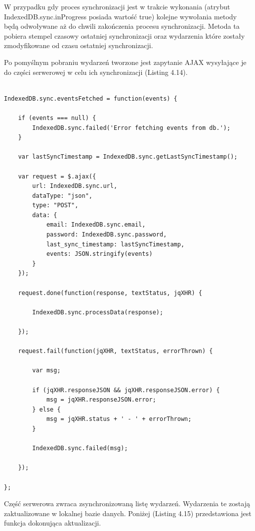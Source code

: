 W przypadku gdy proces synchronizacji jest w trakcie wykonania (atrybut  IndexedDB.sync.inProgress posiada wartość true) kolejne wywołania metody będą odwoływane aż do chwili zakończenia procesu synchronizacji. Metoda ta pobiera stempel czasowy ostatniej synchronizacji oraz wydarzenia które zostały zmodyfikowane od czasu ostatniej synchronizacji.

Po pomyślnym pobraniu wydarzeń tworzone jest zapytanie AJAX wysyłające je do części serwerowej w celu ich synchronizacji (Listing 4.14).

\begin{lstlisting}[caption=Wysłanie żądania synchronizacji do części serwerowej., label=amb, captionpos=b]

IndexedDB.sync.eventsFetched = function(events) {

	if (events === null) {
    	IndexedDB.sync.failed('Error fetching events from db.');
	}

	var lastSyncTimestamp = IndexedDB.sync.getLastSyncTimestamp();

	var request = $.ajax({
    	url: IndexedDB.sync.url,
    	dataType: "json",
    	type: "POST",
    	data: {
        	email: IndexedDB.sync.email,
        	password: IndexedDB.sync.password,
        	last_sync_timestamp: lastSyncTimestamp,
        	events: JSON.stringify(events)
    	}
	});

	request.done(function(response, textStatus, jqXHR) {

    	IndexedDB.sync.processData(response);

	});

	request.fail(function(jqXHR, textStatus, errorThrown) {

    	var msg;

    	if (jqXHR.responseJSON && jqXHR.responseJSON.error) {
        	msg = jqXHR.responseJSON.error;
    	} else {
        	msg = jqXHR.status + ' - ' + errorThrown;
    	}

    	IndexedDB.sync.failed(msg);

	});

};
\end{lstlisting}

Część serwerowa zwraca zsynchronizowaną listę wydarzeń. Wydarzenia te zostają zaktualizowane w lokalnej bazie danych. Poniżej (Listing 4.15) przedstawiona jest funkcja dokonująca aktualizacji.

